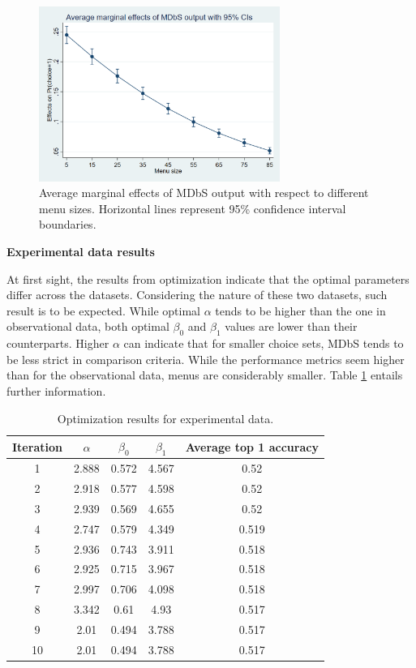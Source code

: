 \documentclass[a4paper,12pt]{article}
\begin{document}
\begin{figure}[h]
    \centering
    \includegraphics[width=0.7\textwidth]{staticFiles/marginsAmadeusGraph.png}
    \caption[Marginal effects of MDbS output]{Average marginal effects of MDbS output with respect to different menu sizes. Horizontal lines represent 95\% confidence interval boundaries.} %
    \label{fig:marginsAmadeusGraph} %

\end{figure}

\textbf{Experimental data results}

At first sight, the results from optimization indicate that the optimal parameters differ across the datasets. Considering the nature of these two datasets, such result is to be expected. While optimal $\alpha$ tends to be higher than the one in observational data, both optimal $\beta_0$ and $\beta_1$ values are lower than their counterparts. Higher $\alpha$ can indicate that for smaller choice sets, MDbS tends to  be less strict in comparison criteria. While the performance metrics seem higher than for the observational data, menus are considerably smaller. Table \ref{tab:optimizationNoghuchiResults} entails further information.

\begin{table}
    \centering
    
    \begin{tabular}{ccccc}
    \hline
    Iteration & $\alpha$ & $\beta_0$ & $\beta_1$ & Average top 1 accuracy\\
    \hline
    1 & 2.888 & 0.572 & 4.567 & 0.52 \\
    2 & 2.918 & 0.577 & 4.598 & 0.52 \\
    3 & 2.939 & 0.569 & 4.655 & 0.52 \\
    4 & 2.747 & 0.579 & 4.349 & 0.519 \\
    5 & 2.936 & 0.743 & 3.911 & 0.518 \\
    6 & 2.925 & 0.715 & 3.967 & 0.518 \\
    7 & 2.997 & 0.706 & 4.098 & 0.518 \\
    8 & 3.342 & 0.61 & 4.93 & 0.517 \\
    9 & 2.01 & 0.494 & 3.788 & 0.517 \\
    10 & 2.01 & 0.494 & 3.788 & 0.517 \\
    \hline
    \end{tabular}
    \caption{Optimization results for experimental data.}
    \label{tab:optimizationNoghuchiResults}
\end{table}
\end{document}
